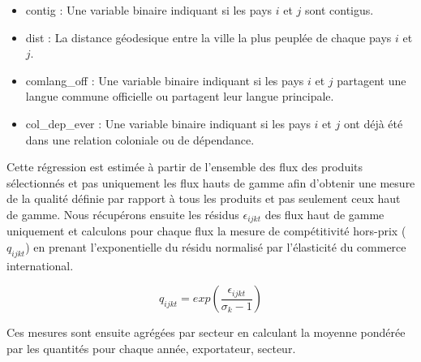 \documentclass[french,10pt,a4paper]{article}
\begin{document}
\begin{itemize}
  \item contig : Une variable binaire indiquant si les pays $i$ et $j$ sont contigus.
  \item dist : La distance géodesique entre la ville la plus peuplée de chaque pays $i$ et $j$.
  \item comlang\_off : Une variable binaire indiquant si les pays $i$ et $j$ partagent une langue commune officielle ou partagent leur langue principale. 
  \item col\_dep\_ever : Une variable binaire indiquant si les pays $i$ et $j$ ont déjà été dans une relation coloniale ou de dépendance. 
\end{itemize}

\bigskip

Cette régression est estimée à partir de l'ensemble des flux des produits sélectionnés et pas uniquement les flux hauts de gamme afin d'obtenir une mesure de la qualité définie par rapport à tous les produits et pas seulement ceux haut de gamme. Nous récupérons ensuite les résidus $\epsilon_{ijkt}$ des flux haut de gamme uniquement et calculons pour chaque flux la mesure de compétitivité hors-prix ($q_{ijkt}$) en prenant l'exponentielle du résidu normalisé par l'élasticité du commerce international. 

\begin{equation}
\label{eq:3}
q_{ijkt} = exp \left( \frac{\epsilon_{ijkt}}{\sigma_k - 1} \right)
\end{equation}

Ces mesures sont ensuite agrégées par secteur en calculant la moyenne pondérée par les quantités pour chaque année, exportateur, secteur. 






\newpage


\end{document}

